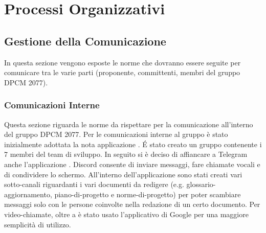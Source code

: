 \section{Processi Organizzativi}

\subsection{Gestione della Comunicazione}
In questa sezione vengono esposte le norme che dovranno essere seguite per comunicare tra le varie parti (proponente,  committenti,  membri  del  gruppo DPCM 2077).
\subsubsection{Comunicazioni Interne}

Questa sezione riguarda le norme da rispettare per la comunicazione all'interno del gruppo DPCM 2077. Per le comunicazioni interne al gruppo è stato inizialmente adottata la nota applicazione .
\'E stato creato un gruppo contenente i 7 membri del team di sviluppo.
In seguito si è deciso di affiancare a Telegram anche l'applicazione .
Discord consente di inviare messaggi, fare chiamate vocali e di condividere lo schermo.
All'interno dell'applicazione sono stati creati vari sotto-canali riguardanti i vari documenti da redigere (e.g. glossario-aggiornamento, piano-di-progetto e norme-di-progetto)
per poter scambiare messaggi solo con le persone coinvolte nella redazione di un certo documento.
Per video-chiamate, oltre a  è stato usato l'applicativo  di Google per una maggiore semplicità di utilizzo.

